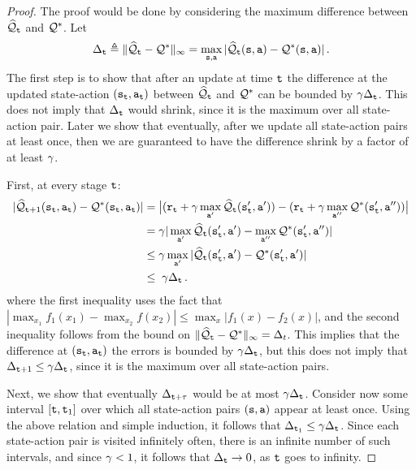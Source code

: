 \begin{proof}
The proof would be done by considering the maximum difference between $\widehat{\mathcal{Q}}_{\tt t}$ and $\mathcal{Q}^*$.
Let
\[
\Delta_{\tt t} \triangleq \|\widehat{\mathcal{Q}}_{\tt t}-\mathcal{Q}^*\|_\infty =
\max_{{\tt s},{\tt a}}
|\widehat{\mathcal{Q}}_{\tt t}({\tt s},{\tt a})-\mathcal{Q}^*({\tt s},{\tt a}) | \,.
\]
The first step is to show that after an update at time ${\tt t}$ the difference at the updated state-action $({\tt s}_{\tt t},{\tt a}_{\tt t})$ between $\widehat{\mathcal{Q}}_{\tt t}$ and $\mathcal{Q}^*$ can be bounded by $\gamma \Delta_{\tt t}$. This does not imply that $\Delta_{{\tt t}}$ would shrink, since it is the maximum over all state-action pair. Later we show that eventually, after we update all state-action pairs at least once, then we are guaranteed to have the difference shrink by a factor of at least $\gamma$. 

First, at every stage ${\tt t}$:
\begin{align*}
| \widehat{\mathcal{Q}}_{{\tt t}+1}({\tt s}_{\tt t},{\tt a}_{\tt t})-
\mathcal{Q}^*({\tt s}_{\tt t},{\tt a}_{\tt t})| &=
\big|({\tt r}_{\tt t}+\gamma\max_{{\tt a}'}
\widehat{\mathcal{Q}}_{\tt t}({\tt s}_{{\tt t}}',{\tt a}'))
- ({\tt r}_{\tt t}+\gamma\max_{{\tt a}''} \mathcal{Q}^*({\tt s}_{{\tt t}}',{\tt a}'') ) \big| \\
&= \gamma |\max_{{\tt a}'} \widehat{\mathcal{Q}}_{\tt t}({\tt s}_{{\tt t}}',{\tt a}') -\max_{{\tt a}''} \mathcal{Q}^*({\tt s}_{{\tt t}}',{\tt a}'') | \\
& \le \gamma \max_{{\tt a}'}
|\widehat{\mathcal{Q}}_{\tt t}({\tt s}_{{\tt t}}',{\tt a}') -
\mathcal{Q}^*({\tt s}_{{\tt t}}',{\tt a}') | \\
&\le\; \gamma \Delta_{\tt t}
\,.
\end{align*}
where the first inequality uses the fact that $|\max_{x_1} f_1(x_1)-\max_{x_2}f(x_2)|\leq \max_x|f_1(x)-f_2(x)|$, and the second inequality follows from the bound on $\|\widehat{\mathcal{Q}}_{\tt t}-\mathcal{Q}^*\|_\infty =\Delta_t $.
This implies that the difference at $({\tt s}_{\tt t},{\tt a}_{\tt t})$ the errors is bounded by $\gamma\Delta_{\tt t}$, but this does not imply that $\Delta_{{\tt t}+1}\leq \gamma\Delta_{{\tt t}}$, since it is the maximum over all state-action pairs.

Next, we show that eventually $\Delta_{{\tt t}+\tau}$ would be at most $ \gamma\Delta_{{\tt t}}$.
Consider now some interval $[{\tt t},{\tt t}_1]$ over which all state-action pairs $({\tt s},{\tt a})$ appear at least once. Using the above relation and simple induction, it follows that $\Delta_{{\tt t}_1} \le \gamma \Delta_{{\tt t}}$.
%
Since each state-action pair is visited infinitely often, there is
an infinite number of such intervals, and since $\gamma<1$, it
follows that $\Delta_{\tt t} \to 0$, as ${\tt t}$ goes to infinity.
\end{proof}

